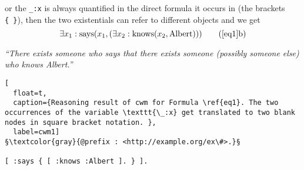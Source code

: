  or 
    the \texttt{\_:x} is always quantified in the direct formula it occurs in (\ie the brackets \texttt{\{~\}}), then the two existentials can refer to different objects 
  and we get
%  
\[
\exists x_1 : \text{says}(x_1, (\exists x_2: \text{knows}(x_2, \text{Albert})))\tag{\ref{eq1}b} \label{zw}\]
\begin{center}\textit{``There exists someone who says that there exists someone (possibly someone else) who knows Albert.''}\end{center}
\begin{lstlisting}[
  float=t,
  caption={Reasoning result of cwm for Formula \ref{eq1}. The two occurrences of the variable \texttt{\_:x} get translated to two blank nodes in square bracket notation. },
  label=cwm1]
§\textcolor{gray}{@prefix : <http://example.org/ex\#>.}§

[ :says { [ :knows :Albert ]. } ].
\end{lstlisting}

